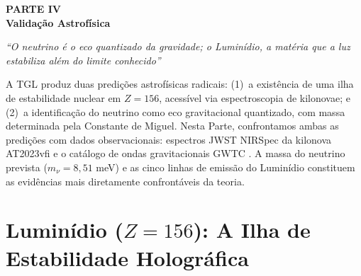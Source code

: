 \documentclass[12pt,a4paper,twoside]{article}
\begin{document}

\setcounter{section}{0}
\renewcommand{\thesection}{IV.\arabic{section}}
\renewcommand{\theequation}{IV.\arabic{equation}}
\renewcommand{\theHsection}{IV.\arabic{section}} %
\setcounter{footnote}{0}

\begin{center}
\vspace*{1cm}
{\huge\bfseries\color{tglblue} PARTE IV}\\[0.5cm]
{\LARGE\bfseries\color{tglblue} Valida\c{c}\~ao Astrof\'isica}\\[0.3cm]
\vspace*{1cm}

{\large\itshape ``O neutrino \'e o eco quantizado da gravidade; o Lumin\'idio, a mat\'eria que a luz estabiliza al\'em do limite conhecido''}\\[0.3cm]
\vspace*{1.5cm}
\end{center}

\noindent A TGL produz duas predi\c{c}\~oes astrof\'isicas radicais: (1)~a exist\^encia de uma ilha de estabilidade nuclear em $Z = 156$, acess\'ivel via espectroscopia de kilonovae; e (2)~a identifica\c{c}\~ao do neutrino como eco gravitacional quantizado, com massa determinada pela Constante de Miguel. Nesta Parte, confrontamos ambas as predi\c{c}\~oes com dados observacionais: espectros JWST NIRSpec da kilonova AT2023vfi \cite{Gillanders2025} e o cat\'alogo de ondas gravitacionais GWTC \cite{GWTC3}. A massa do neutrino prevista ($m_\nu = 8{,}51$ meV) e as cinco linhas de emiss\~ao do Lumin\'idio constituem as evid\^encias mais diretamente confront\'aveis da teoria.




\section{Lumin\'idio ($Z = 156$): A Ilha de Estabilidade Hologr\'afica}
\end{document}
